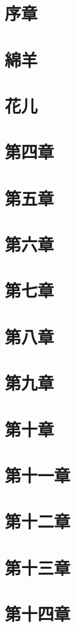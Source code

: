 \documentclass[12pt,a4paper,oneside,openany]{book}
\begin{document}
\tableofcontents

\chapter{序章}


\chapter{綿羊}


\chapter{花儿}


\chapter{第四章}


\chapter{第五章}


\chapter{第六章}


\chapter{第七章}


\chapter{第八章}


\chapter{第九章}


\chapter{第十章}


\chapter{第十一章}


\chapter{第十二章}


\chapter{第十三章}


\chapter{第十四章}

\end{document}
